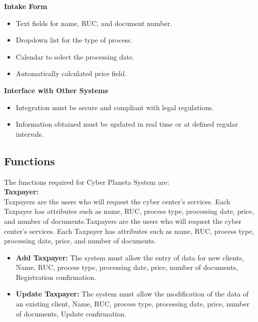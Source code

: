 \documentclass[12pt,a4paper, twosite]{article}
\begin{document}
\textbf {Intake Form}

\begin{itemize}
\item Text fields for name, RUC, and document number.
\item Dropdown list for the type of process.
\item Calendar to select the processing date.
\item Automatically calculated price field.\\
\end{itemize}

\textbf {Interface with Other Systems}

\begin{itemize}
\item Integration must be secure and compliant with legal regulations.
\item Information obtained must be updated in real time or at defined regular intervals.
\end{itemize}

\subsection{Functions}
\label{sec:org307bb59}

The functions required for Cyber Planeta System are:\\

\textbf{Taxpayer:}\\
Taxpayers are the users who will request the cyber center's services. Each Taxpayer has attributes such as name, RUC, process type, processing date, price, and number of documents.Taxpayers are the users who will request the cyber center's services. Each Taxpayer has attributes such as name, RUC, process type, processing date, price, and number of documents.
\begin{itemize}
\item \textbf {Add Taxpayer:}
The system must allow the entry of data for new clients, Name, RUC, process type, processing date, price, number of documents, Registration confirmation.
\end{itemize}
\begin{itemize}
\item \textbf {Update Taxpayer:}
The system must allow the modification of the data of an existing client, Name, RUC, process type, processing date, price, number of documents, Update confirmation.
\end{itemize}
\end{document}

